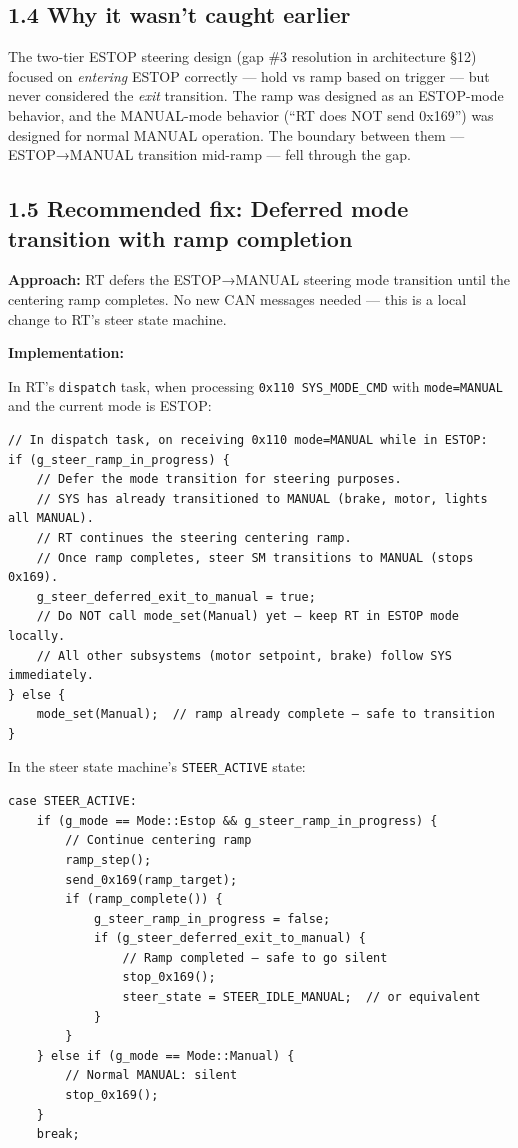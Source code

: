 \documentclass[12pt,a4paper,oneside]{report}
\begin{document}
\subsection{1.4 Why it wasn't caught earlier}\label{why-it-wasnt-caught-earlier}

The two-tier ESTOP steering design (gap \#3 resolution in architecture §12)
focused on \emph{entering} ESTOP correctly --- hold vs ramp based on trigger ---
but never considered the \emph{exit} transition. The ramp was designed as an
ESTOP-mode behavior, and the MANUAL-mode behavior (``RT does NOT send 0x169'')
was designed for normal MANUAL operation. The boundary between them ---
ESTOP→MANUAL transition mid-ramp --- fell through the gap.

\subsection{1.5 Recommended fix: Deferred mode transition with ramp
completion}\label{recommended-fix-deferred-mode-transition-with-ramp-completion}

\textbf{Approach:} RT defers the ESTOP→MANUAL steering mode transition until the
centering ramp completes. No new CAN messages needed --- this is a local change
to RT's steer state machine.

\textbf{Implementation:}

In RT's \texttt{dispatch} task, when processing \texttt{0x110\ SYS\_MODE\_CMD}
with \texttt{mode=MANUAL} and the current mode is ESTOP:

\begin{verbatim}
// In dispatch task, on receiving 0x110 mode=MANUAL while in ESTOP:
if (g_steer_ramp_in_progress) {
    // Defer the mode transition for steering purposes.
    // SYS has already transitioned to MANUAL (brake, motor, lights all MANUAL).
    // RT continues the steering centering ramp.
    // Once ramp completes, steer SM transitions to MANUAL (stops 0x169).
    g_steer_deferred_exit_to_manual = true;
    // Do NOT call mode_set(Manual) yet — keep RT in ESTOP mode locally.
    // All other subsystems (motor setpoint, brake) follow SYS immediately.
} else {
    mode_set(Manual);  // ramp already complete — safe to transition
}
\end{verbatim}

In the steer state machine's \texttt{STEER\_ACTIVE} state:

\begin{verbatim}
case STEER_ACTIVE:
    if (g_mode == Mode::Estop && g_steer_ramp_in_progress) {
        // Continue centering ramp
        ramp_step();
        send_0x169(ramp_target);
        if (ramp_complete()) {
            g_steer_ramp_in_progress = false;
            if (g_steer_deferred_exit_to_manual) {
                // Ramp completed — safe to go silent
                stop_0x169();
                steer_state = STEER_IDLE_MANUAL;  // or equivalent
            }
        }
    } else if (g_mode == Mode::Manual) {
        // Normal MANUAL: silent
        stop_0x169();
    }
    break;
\end{verbatim}
\end{document}
